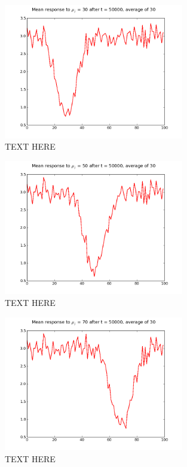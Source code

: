 \begin{figure}[h]
\centering
\includegraphics[width=0.7\textwidth]{../ex2/weights_mu30_t50k_mean.png}
\caption{TEXT HERE}
\label{fig:mu30}
\end{figure}

\begin{figure}[h]
\centering
\includegraphics[width=0.7\textwidth]{../ex2/weights_mu50_t50k_mean.png}
\caption{TEXT HERE}
\label{fig:mu50}
\end{figure}

\begin{figure}[h]
\centering
\includegraphics[width=0.7\textwidth]{../ex2/weights_mu70_t50k_mean.png}
\caption{TEXT HERE}
\label{fig:mu70}
\end{figure}

